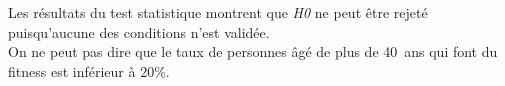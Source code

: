 \begin{enumerate}
        Les résultats du test statistique montrent que \textit{H0} ne peut être rejeté puisqu'aucune des conditions n'est validée. \\
        On ne peut pas dire que le taux de personnes âgé de plus de 40~ans qui font du fitness est inférieur à $20\%$.
\end{enumerate}